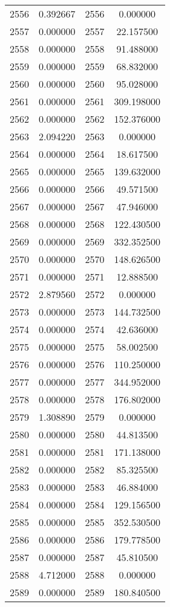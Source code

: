 \documentclass[12pt]{article}
\begin{document}
\begin{longtable}{@{}cccc@{}}
2556 & 0.392667 & 2556 & 0.000000 \\
2557 & 0.000000 & 2557 & 22.157500 \\
2558 & 0.000000 & 2558 & 91.488000 \\
2559 & 0.000000 & 2559 & 68.832000 \\
2560 & 0.000000 & 2560 & 95.028000 \\
2561 & 0.000000 & 2561 & 309.198000 \\
2562 & 0.000000 & 2562 & 152.376000 \\
2563 & 2.094220 & 2563 & 0.000000 \\
2564 & 0.000000 & 2564 & 18.617500 \\
2565 & 0.000000 & 2565 & 139.632000 \\
2566 & 0.000000 & 2566 & 49.571500 \\
2567 & 0.000000 & 2567 & 47.946000 \\
2568 & 0.000000 & 2568 & 122.430500 \\
2569 & 0.000000 & 2569 & 332.352500 \\
2570 & 0.000000 & 2570 & 148.626500 \\
2571 & 0.000000 & 2571 & 12.888500 \\
2572 & 2.879560 & 2572 & 0.000000 \\
2573 & 0.000000 & 2573 & 144.732500 \\
2574 & 0.000000 & 2574 & 42.636000 \\
2575 & 0.000000 & 2575 & 58.002500 \\
2576 & 0.000000 & 2576 & 110.250000 \\
2577 & 0.000000 & 2577 & 344.952000 \\
2578 & 0.000000 & 2578 & 176.802000 \\
2579 & 1.308890 & 2579 & 0.000000 \\
2580 & 0.000000 & 2580 & 44.813500 \\
2581 & 0.000000 & 2581 & 171.138000 \\
2582 & 0.000000 & 2582 & 85.325500 \\
2583 & 0.000000 & 2583 & 46.884000 \\
2584 & 0.000000 & 2584 & 129.156500 \\
2585 & 0.000000 & 2585 & 352.530500 \\
2586 & 0.000000 & 2586 & 179.778500 \\
2587 & 0.000000 & 2587 & 45.810500 \\
2588 & 4.712000 & 2588 & 0.000000 \\
2589 & 0.000000 & 2589 & 180.840500 \\

\end{longtable}
\end{document}
